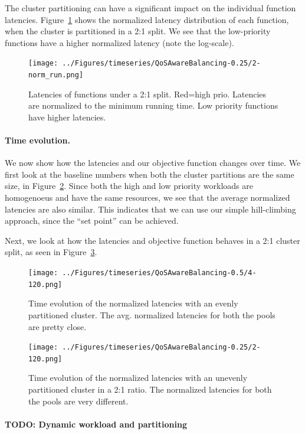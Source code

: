 The cluster partitioning can have a significant impact on the individual function latencies.
Figure~\ref{fig:violin-0.25} shows the normalized latency distribution of each function, when the cluster is partitioned in a 2:1 split.
We see that the low-priority functions have a higher normalized latency (note the log-scale). 

\begin{figure}
  \centering  \texttt{[image: ../Figures/timeseries/QoSAwareBalancing-0.25/2-norm\_run.png]}
  \caption{Latencies of functions under a 2:1 split. Red=high prio. Latencies are normalized to the minimum running time. Low priority functions have higher latencies.}
  \label{fig:violin-0.25}
\end{figure}



\paragraph{Time evolution.}

We now show how the latencies and our objective function changes over time.
We first look at the baseline numbers when both the cluster partitions are the same size, in Figure~\ref{fig:ts-0.5}.
Since both the high and low priority workloads are homogenoeus and have the same resources, we see that the average normalized latencies are also similar.
This indicates that we can use our simple hill-climbing approach, since the ``set point'' can be achieved. 


Next, we look at how the latencies and objective function behaves in a 2:1 cluster split, as seen in Figure~\ref{fig:ts-0.25}. 

\begin{figure}
  \centering  \texttt{[image: ../Figures/timeseries/QoSAwareBalancing-0.5/4-120.png]}
  \caption{Time evolution of the normalized latencies with an evenly partitioned cluster. The avg. normalized latencies for both the pools are pretty close. }
  \label{fig:ts-0.5}
\end{figure}


\begin{figure}
  \centering  \texttt{[image: ../Figures/timeseries/QoSAwareBalancing-0.25/2-120.png]}
  \caption{Time evolution of the normalized latencies with an unevenly partitioned cluster in a 2:1 ratio. The normalized latencies for both the pools are very different. }
  \label{fig:ts-0.25}
\end{figure}


\paragraph{TODO: Dynamic workload and partitioning}



